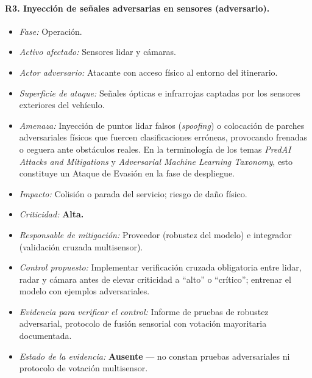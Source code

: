 \documentclass[11pt]{article}
\begin{document}
\paragraph{R3. Inyección de señales adversarias en sensores (adversario).}
\begin{itemize}[nosep]
    \item \textit{Fase:} Operación.
    \item \textit{Activo afectado:} Sensores lidar y cámaras.
    \item \textit{Actor adversario:} Atacante con acceso físico al entorno del itinerario.
    \item \textit{Superficie de ataque:} Señales ópticas e infrarrojas captadas por los sensores exteriores del vehículo.
    \item \textit{Amenaza:} Inyección de puntos lidar falsos (\textit{spoofing}) o colocación de parches adversariales físicos que fuercen clasificaciones erróneas, provocando frenadas o ceguera ante obstáculos reales. En la terminología de los temas \textit{PredAI Attacks and Mitigations} y \textit{Adversarial Machine Learning Taxonomy}, esto constituye un Ataque de Evasión en la fase de despliegue.
    \item \textit{Impacto:} Colisión o parada del servicio; riesgo de daño físico.
    \item \textit{Criticidad:} \textbf{Alta.}
    \item \textit{Responsable de mitigación:} Proveedor (robustez del modelo) e integrador (validación cruzada multisensor).
    \item \textit{Control propuesto:} Implementar verificación cruzada obligatoria entre lidar, radar y cámara antes de elevar criticidad a ``alto'' o ``crítico''; entrenar el modelo con ejemplos adversariales.
    \item \textit{Evidencia para verificar el control:} Informe de pruebas de robustez adversarial, protocolo de fusión sensorial con votación mayoritaria documentada.
    \item \textit{Estado de la evidencia:} \textbf{Ausente} --- no constan pruebas adversariales ni protocolo de votación multisensor.
\end{itemize}
\end{document}
